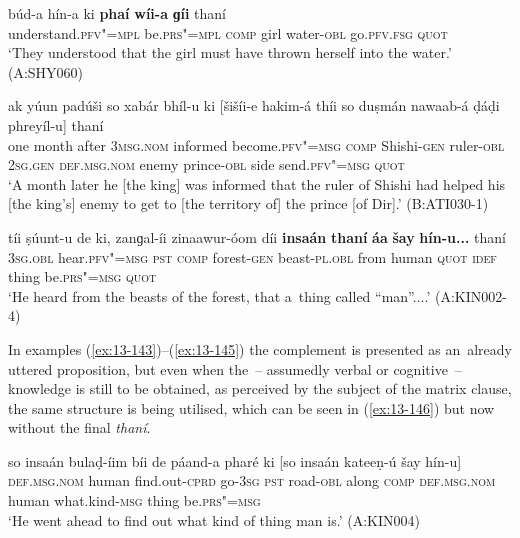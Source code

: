\begin{exe}
\ex
\label{ex:13-143}
\gll \label{bkm:Ref190835538}búd-a hín-a ki \textbf{phaí} \textbf{wíi-a} \textbf{ ɡíi} thaní \\
understand.\textsc{pfv"=mpl} be.\textsc{prs"=mpl} \textsc{comp} girl water-\textsc{obl} go.\textsc{pfv.fsg} \textsc{quot} \\
\glt `They understood that the girl must have thrown herself into the water.' (A:SHY060)

\ex
\label{ex:13-144}
\gll ak yúun padúši so xabár bhíl-u  ki [šišíi-e hakim-á thíi so
  duṣmán nawaab-á  ḍáḍi phreyíl-u] thaní \\
one month after \textsc{3msg.nom} informed become.\textsc{pfv"=msg}  \textsc{comp} Shishi-\textsc{gen} ruler-\textsc{obl } \textsc{2sg.gen} \textsc{def.msg.nom} enemy prince-\textsc{obl} side send.\textsc{pfv"=msg} \textsc{quot}  \\
\glt `A month later he [the king] was informed that the ruler of Shishi had helped his [the king's] enemy to get to [the territory of] the prince [of Dir].' (B:ATI030-1)

\ex
\label{ex:13-145}
\gll \label{bkm:Ref190835565}tíi ṣúunt-u de ki, zanɡal-íi zinaawur-óom  díi \textbf{insaán} \textbf{thaní} \textbf{áa} \textbf{šay} \textbf{hín-u\textbf{...}} thaní \\
\textsc{3sg.obl} hear.\textsc{pfv"=msg} \textsc{pst} \textsc{comp} forest-\textsc{gen} beast-\textsc{pl.obl}  from human \textsc{quot} \textsc{idef} thing be.\textsc{prs"=msg} \textsc{quot} \\
\glt `He heard from the beasts of the forest, that a~thing called ``man''....' (A:KIN002-4) 
\end{exe}

In examples (\ref{ex:13-143})--(\ref{ex:13-145}) the complement is presented as an~already uttered proposition, but even when the~-- assumedly verbal or cognitive~-- knowledge is still to be obtained, as perceived by the subject of the matrix clause, the same structure is being utilised, which can be seen in (\ref{ex:13-146}) but now without the final \textit{thaní}. 

\begin{exe}
\ex
\label{ex:13-146}
\gll so insaán bulaḍ-íim bíi de páand-a  pharé ki [so insaán kateeṇ-ú
  šay  hín-u]\\
\textsc{def.msg.nom} human find.out-\textsc{cprd} go-\textsc{3sg} \textsc{pst} road-\textsc{obl}  along \textsc{comp} \textsc{def.msg.nom} human what.kind-\textsc{msg} thing be.\textsc{prs"=msg}\\
\glt `He went ahead to find out what kind of thing man is.' (A:KIN004) 
\end{exe}

